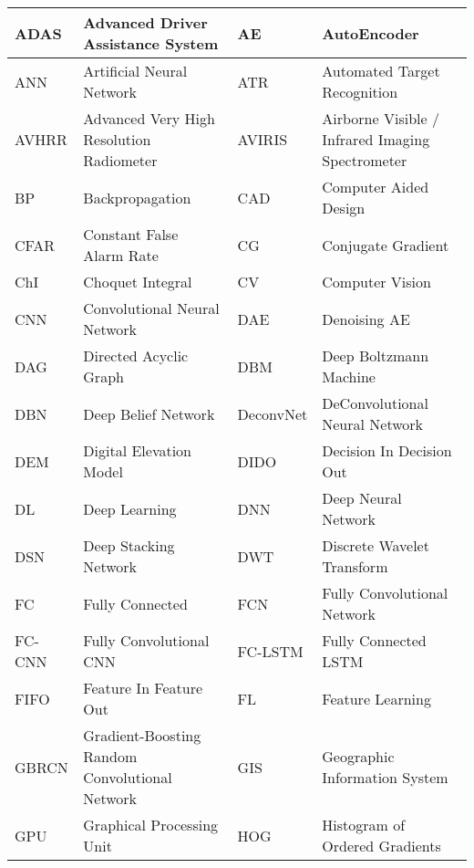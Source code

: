 \documentclass[12pt]{spieman}
\begin{document}
\begin{spacing}{1}
\begin{center}
\begin{longtable}{|p{1.5cm}|p{5.5cm}|p{1.5cm}|p{5.5cm}|}
ADAS      & Advanced Driver Assistance System &                        AE        & AutoEncoder   \\  \hline  
ANN       & Artificial Neural Network &                                ATR       & Automated Target Recognition \\  \hline
AVHRR     & Advanced Very High Resolution Radiometer &                 AVIRIS    & Airborne Visible / Infrared Imaging Spectrometer \\  \hline
BP        & Backpropagation &                                          CAD       & Computer Aided Design \\  \hline
CFAR      & Constant False Alarm Rate &                                CG        & Conjugate Gradient \\  \hline
ChI       & Choquet Integral &                                         CV        & Computer Vision \\  \hline
CNN       & Convolutional Neural Network &                             DAE       & Denoising AE      \\  \hline
DAG       & Directed Acyclic Graph &                                   DBM       & Deep Boltzmann Machine \\  \hline
DBN       & Deep Belief Network &                                      DeconvNet      & DeConvolutional Neural Network \\  \hline
DEM       & Digital Elevation Model &                                  DIDO      & Decision In Decision Out \\  \hline
DL        & Deep Learning &                                            DNN       & Deep Neural Network \\  \hline
DSN       & Deep Stacking Network &                                    DWT       & Discrete Wavelet Transform \\  \hline
FC        & Fully Connected &                                          FCN       & Fully Convolutional Network \\  \hline
FC-CNN    & Fully Convolutional CNN &                                  FC-LSTM   & Fully Connected LSTM \\  \hline
FIFO      & Feature In Feature Out &                                   FL        & Feature Learning \\  \hline  
GBRCN     & Gradient-Boosting Random Convolutional Network &           GIS       & Geographic Information System \\  \hline
GPU       & Graphical Processing Unit &                                HOG       & Histogram of Ordered Gradients \\  \hline

\end{longtable}
\end{center}
\end{spacing}
\end{document}
